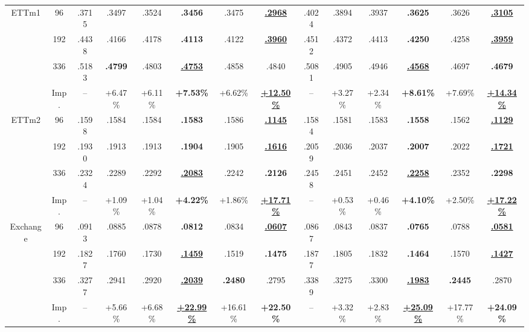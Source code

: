 \documentclass{article}
\begin{document}
\begin{table}[t]
{\begin{tabular}{cc*{12}{c}}
\midrule
\multirow{4}{*}{ETTm1} & 96 & .3715 & .3497 & .3524 & \textbf{.3456} & .3475 & \underline{\textbf{.2968}} & .4024 & .3894 & .3937 & \textbf{.3625} & .3626 & \underline{\textbf{.3105}} \\
 & 192 & .4438 & .4166 & .4178 & \textbf{.4113} & .4122 & \underline{\textbf{.3960}} & .4512 & .4372 & .4413 & \textbf{.4250} & .4258 & \underline{\textbf{.3959}} \\
 & 336 & .5183 & \textbf{.4799} & .4803 & \underline{\textbf{.4753}} & .4858 & .4840 & .5081 & .4905 & .4946 & \underline{\textbf{.4568}} & .4697 & \textbf{.4679} \\
 & Imp. & -- & +6.47\% & +6.11\% & \textbf{+7.53\%} & +6.62\% & \underline{\textbf{+12.50\%}} & -- & +3.27\% & +2.34\% & \textbf{+8.61\%} & +7.69\% & \underline{\textbf{+14.34\%}} \\
\midrule
\multirow{4}{*}{ETTm2} & 96 & .1598 & .1584 & .1584 & \textbf{.1583} & .1586 & \underline{\textbf{.1145}} & .1584 & .1581 & .1583 & \textbf{.1558} & .1562 & \underline{\textbf{.1129}} \\
 & 192 & .1930 & .1913 & .1913 & \textbf{.1904} & .1905 & \underline{\textbf{.1616}} & .2059 & .2036 & .2037 & \textbf{.2007} & .2022 & \underline{\textbf{.1721}} \\
 & 336 & .2324 & .2289 & .2292 & \underline{\textbf{.2083}} & .2242 & \textbf{.2126} & .2458 & .2451 & .2452 & \underline{\textbf{.2258}} & .2352 & \textbf{.2298} \\
 & Imp. & -- & +1.09\% & +1.04\% & \textbf{+4.22\%} & +1.86\% & \underline{\textbf{+17.71\%}} & -- & +0.53\% & +0.46\% & \textbf{+4.10\%} & +2.50\% & \underline{\textbf{+17.22\%}} \\
\midrule
\multirow{4}{*}{Exchange} & 96 & .0913 & .0885 & .0878 & \textbf{.0812} & .0834 & \underline{\textbf{.0607}} & .0867 & .0843 & .0837 & \textbf{.0765} & .0788 & \underline{\textbf{.0581}} \\
 & 192 & .1827 & .1760 & .1730 & \underline{\textbf{.1459}} & .1519 & \textbf{.1475} & .1877 & .1805 & .1832 & \textbf{.1464} & .1570 & \underline{\textbf{.1427}} \\
 & 336 & .3277 & .2941 & .2920 & \underline{\textbf{.2039}} & \textbf{.2480} & .2795 & .3389 & .3275 & .3300 & \underline{\textbf{.1983}} & \textbf{.2445} & .2870 \\
 & Imp. & -- & +5.66\% & +6.68\% & \underline{\textbf{+22.99\%}} & +16.61\% & \textbf{+22.50\%} & -- & +3.32\% & +2.83\% & \underline{\textbf{+25.09\%}} & +17.77\% & \textbf{+24.09\%} \\

\end{tabular}}
\end{table}
\end{document}
